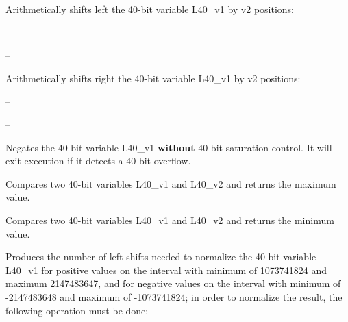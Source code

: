 
Arithmetically shifts left the 40-bit variable L40\_v1 by v2 positions:

 -- 

 -- 


Arithmetically shifts right the 40-bit variable L40\_v1 by v2 positions:

 -- 

 -- 


Negates the 40-bit variable L40\_v1 \textbf{without} 40-bit saturation control.
It will exit execution if it detects a 40-bit overflow.


Compares two 40-bit variables L40\_v1 and L40\_v2 and returns the maximum value.


Compares two 40-bit variables L40\_v1 and L40\_v2 and returns the minimum value.


Produces the number of left shifts needed to normalize the 40-bit variable L40\_v1 for positive values on the interval with minimum
of 1073741824 and maximum 2147483647, and for negative values on the interval with minimum of -2147483648 and maximum of -1073741824;
in order to normalize the result, the following operation must be done:

